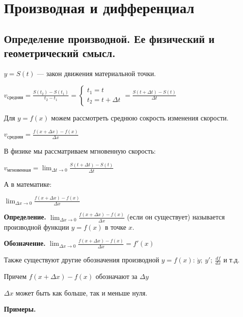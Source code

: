 \documentclass{article}
\begin{document}
    \section{Производная и дифференциал}
    \subsection{Определение производной. Ее физический и геометрический смысл.}

    \( y = S(t) \) --- закон движения материальной точки. 

    \( v_\textrm{средняя} = \frac{S(t_2) - S(t_1)}{t_2 - t_1} = \begin{cases}
        t_1 = t\\
        t_2 = t + \Delta t
    \end{cases} = \frac{S(t + \Delta t) - S(t)}{\Delta t} \)

    Для \( y = f(x) \) можем рассмотреть среднюю сокрость изменения скорости.

    \( v_\textrm{средняя} = \frac{f(x + \Delta x) - f(x)}{\Delta x} \)

    В физике мы рассматриваем мгновенную скорость:
    
    \( v_\textrm{мгновенная} = \lim_{\Delta t \to 0} \frac{S(t + \Delta t) - S(t)}{\Delta t} \)
    
    А в математике:
    
    \(\lim_{\Delta x \to 0} \frac{f(x+\Delta x)-f(x)}{\Delta x}\)
    
    \textbf{Определение.} \( \lim_{\Delta x \to 0} \frac{f(x + \Delta x) - f(x)}{\Delta x} \) (если он существует) называется производной функции \( y = f(x) \) в точке \(x\).

    \textbf{Обозначение.} \( \lim_{\Delta x \to 0} \frac{f(x + \Delta x) - f(x)}{\Delta x} = f'(x) \)

    Также существуют другие обозначения производной \( y = f(x) \): \( \dot{y};\ y';\ \frac{df}{dx} \) и т.д.

    Причем \( f(x + \Delta x) - f(x) \) обозначают за \(\Delta y\)
    
    \(\Delta x\) может быть как больше, так и меньше нуля.

    \textbf{Примеры.}
\end{document}

